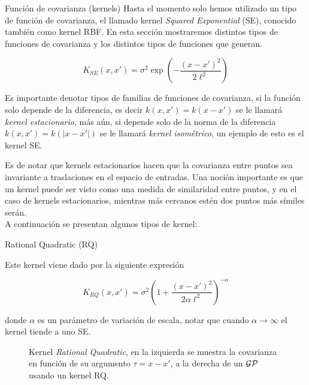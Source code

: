 \documentclass[handout, 9pt]{beamer}
\begin{document}
\begin{frame}{Función de covarianza (kernels)}
    Hasta el momento solo hemos utilizado un tipo de función de covarianza, el llamado kernel \textit{Squared Exponential} (SE), conocido también como kernel RBF. En esta sección mostraremos distintos tipos de funciones de covarianza y los distintos tipos de funciones que generan. \pause 

    \begin{equation*}
	K_{SE}(x, x') = \sigma^2 \exp\left( - \frac{\left( x- x'\right)^2}{2\ell^2} \right)
    \end{equation*} \pause 

    Es importante denotar tipos de familias de funciones de covarianza, si la función solo depende de la diferencia, es decir $k(x, x')=k(x-x')$ se le llamará \textit{kernel estacionario}, más aún, si depende solo de la norma de la diferencia $k(x, x')=k(|x-x'|)$ se le llamará \textit{kernel isométrico}, un ejemplo de esto es el kernel SE. \pause \vspace{0.2cm}

    Es de notar que kernels estacionarios hacen que la covarianza entre puntos sea invariante a traslaciones en el espacio de entradas. Una noción importante es que un kernel puede ser visto como una medida de similaridad entre puntos, y en el caso de kernels estacionarios, mientras más cercanos estén dos puntos más símiles serán. \\

    A continuación se presentan algunos tipos de kernel:
    
\end{frame}

\begin{frame}{Rational Quadratic (RQ)}


    Este kernel viene dado por la siguiente expresión 
 
    \begin{equation*}\label{eq:gp_kernel_rq}
	K_{RQ}(x, x') = \sigma^2 \left(1 + \frac{\left( x- x'\right)^2}{2\alpha\ell^2 } \right)^{-\alpha}
    \end{equation*}

    donde $\alpha$ es un parámetro de variación de escala, notar que cuando $\alpha \rightarrow \infty$ el kernel tiende a uno SE. \pause

    \begin{figure}[H]
	    \centering
	    \caption{Kernel \textit{Rational Quadratic}, en la izquierda se muestra la covarianza en función de su argumento $\tau=x-x'$, a la derecha de un $\mathcal{GP}$ usando un kernel RQ.}
    \end{figure}

    
\end{frame}
\end{document}
